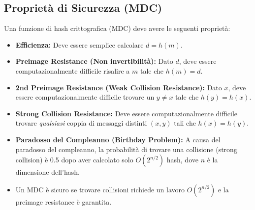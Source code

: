 \documentclass[../main.tex]{subfiles}
\begin{document}
\subsection{Proprietà di Sicurezza (MDC)}
Una funzione di hash crittografica (MDC) deve avere le seguenti proprietà:
\begin{itemize}
    \item \textbf{Efficienza:} Deve essere semplice calcolare $d=h(m)$.
    \item \textbf{Preimage Resistance (Non invertibilità):} Dato $d$, deve essere computazionalmente difficile risalire a $m$ tale che $h(m)=d$.
    \item \textbf{2nd Preimage Resistance (Weak Collision Resistance):} Dato $x$, deve essere computazionalmente difficile trovare un $y \neq x$ tale che $h(y) = h(x)$.
    \item \textbf{Strong Collision Resistance:} Deve essere computazionalmente difficile trovare \emph{qualsiasi} coppia di messaggi distinti $(x, y)$ tali che $h(x) = h(y)$.
    \item \textbf{Paradosso del Compleanno (Birthday Problem):} A causa del paradosso del compleanno, la probabilità di trovare una collisione (strong collision) è 0.5 dopo aver calcolato solo $O(2^{n/2})$ hash, dove $n$ è la dimensione dell'hash.
    \item Un MDC è sicuro se trovare collisioni richiede un lavoro $O(2^{n/2})$ e la preimage resistance è garantita.
\end{itemize}
\end{document}
